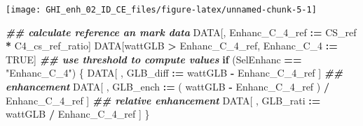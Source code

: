 \documentclass[
  10pt,
  a4paper,oneside]{article}
\newenvironment{Shaded}{\begin{snugshade}}{\end{snugshade}}
\newcommand{\AttributeTok}[1]{\textcolor[rgb]{0.13,0.29,0.53}{#1}}
\newcommand{\ConstantTok}[1]{\textcolor[rgb]{0.56,0.35,0.01}{#1}}
\newcommand{\ControlFlowTok}[1]{\textcolor[rgb]{0.13,0.29,0.53}{\textbf{#1}}}
\newcommand{\DecValTok}[1]{\textcolor[rgb]{0.00,0.00,0.81}{#1}}
\newcommand{\DocumentationTok}[1]{\textcolor[rgb]{0.56,0.35,0.01}{\textbf{\textit{#1}}}}
\newcommand{\FloatTok}[1]{\textcolor[rgb]{0.00,0.00,0.81}{#1}}
\newcommand{\FunctionTok}[1]{\textcolor[rgb]{0.13,0.29,0.53}{\textbf{#1}}}
\newcommand{\NormalTok}[1]{#1}
\newcommand{\OtherTok}[1]{\textcolor[rgb]{0.56,0.35,0.01}{#1}}
\newcommand{\SpecialCharTok}[1]{\textcolor[rgb]{0.81,0.36,0.00}{\textbf{#1}}}
\newcommand{\StringTok}[1]{\textcolor[rgb]{0.31,0.60,0.02}{#1}}
\begin{document}
\begin{Shaded}
\end{Shaded}

\begin{center}\texttt{[image: GHI\_enh\_02\_ID\_CE\_files/figure-latex/unnamed-chunk-5-1]} \end{center}

\begin{Shaded}
\begin{Highlighting}[]
\DocumentationTok{\#\# calculate reference an mark data}
\NormalTok{DATA[, Enhanc\_C\_4\_ref }\SpecialCharTok{:=}\NormalTok{ CS\_ref }\SpecialCharTok{*}\NormalTok{ C4\_cs\_ref\_ratio]}
\NormalTok{DATA[wattGLB }\SpecialCharTok{\textgreater{}}\NormalTok{ Enhanc\_C\_4\_ref,}
\NormalTok{     Enhanc\_C\_4 }\SpecialCharTok{:=} \ConstantTok{TRUE}\NormalTok{]}
\DocumentationTok{\#\# use threshold to compute values}
\ControlFlowTok{if}\NormalTok{ (SelEnhanc }\SpecialCharTok{==} \StringTok{"Enhanc\_C\_4"}\NormalTok{) \{}
\NormalTok{    DATA[ , GLB\_diff }\SpecialCharTok{:=}\NormalTok{   wattGLB }\SpecialCharTok{{-}}\NormalTok{ Enhanc\_C\_4\_ref                    ] }\DocumentationTok{\#\# enhancement}
\NormalTok{    DATA[ , GLB\_ench }\SpecialCharTok{:=}\NormalTok{ ( wattGLB }\SpecialCharTok{{-}}\NormalTok{ Enhanc\_C\_4\_ref ) }\SpecialCharTok{/}\NormalTok{ Enhanc\_C\_4\_ref ] }\DocumentationTok{\#\# relative enhancement}
\NormalTok{    DATA[ , GLB\_rati }\SpecialCharTok{:=}\NormalTok{   wattGLB }\SpecialCharTok{/}\NormalTok{ Enhanc\_C\_4\_ref                    ]}
\NormalTok{\}}
\end{Highlighting}
\end{Shaded}
\end{document}
